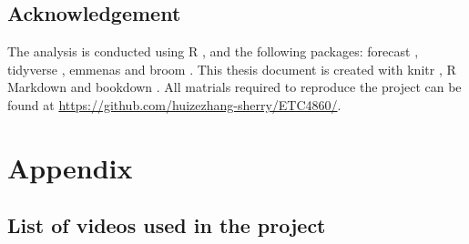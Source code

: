 \documentclass{monashthesis}
\begin{document}
\hypertarget{acknowledgement}{%
\section{Acknowledgement}\label{acknowledgement}}

The analysis is conducted using R \autocite{Rlanguage}, and the following packages: forecast \autocite{forecast}, tidyverse \autocite{tidyverse}, emmenas \autocite{emmeans} and broom \autocite{broom}. This thesis document is created with knitr \autocite{knitr}, R Markdown \autocite{rmarkdown} and bookdown \autocite{bookdown}. All matrials required to reproduce the project can be found at \url{https://github.com/huizezhang-sherry/ETC4860/}.

\hypertarget{appendix}{%
\chapter{Appendix}\label{appendix}}

\hypertarget{list-of-videos-used-in-the-project}{%
\section{List of videos used in the project}\label{list-of-videos-used-in-the-project}}
\end{document}
